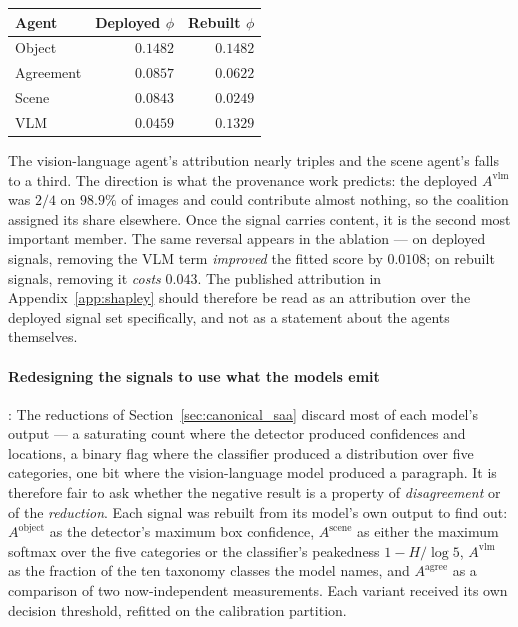 \documentclass[12pt,a4paper]{report}
\begin{document}
\begin{enumerate}
\begin{center}
\small
\begin{tabular}{@{}l r r@{}}
\toprule
\textbf{Agent} & \textbf{Deployed $\phi$} & \textbf{Rebuilt $\phi$} \\
\midrule
Object & $0.1482$ & $0.1482$ \\
Agreement & $0.0857$ & $0.0622$ \\
Scene & $0.0843$ & $\mathbf{0.0249}$ \\
VLM & $0.0459$ & $\mathbf{0.1329}$ \\
\bottomrule
\end{tabular}
\end{center}

The vision-language agent's attribution nearly triples and the scene agent's falls to a third. The
direction is what the provenance work predicts: the deployed $A^{\text{vlm}}$ was $2/4$ on $98.9\%$
of images and could contribute almost nothing, so the coalition assigned its share elsewhere. Once
the signal carries content, it is the second most important member. The same reversal appears in
the ablation --- on deployed signals, removing the VLM term \emph{improved} the fitted score by
$0.0108$; on rebuilt signals, removing it \emph{costs} $0.043$. The published attribution in
Appendix~\ref{app:shapley} should therefore be read as an attribution over the deployed signal set
specifically, and not as a statement about the agents themselves.

\paragraph{Redesigning the signals to use what the models emit}: The reductions of
Section~\ref{sec:canonical_saa} discard most of each model's output --- a saturating count where
the detector produced confidences and locations, a binary flag where the classifier produced a
distribution over five categories, one bit where the vision-language model produced a paragraph.
It is therefore fair to ask whether the negative result is a property of \emph{disagreement} or of
the \emph{reduction}. Each signal was rebuilt from its model's own output to find out:
$A^{\text{object}}$ as the detector's maximum box confidence, $A^{\text{scene}}$ as either the
maximum softmax over the five categories or the classifier's peakedness $1-H/\log 5$,
$A^{\text{vlm}}$ as the fraction of the ten taxonomy classes the model names, and
$A^{\text{agree}}$ as a comparison of two now-independent measurements. Each variant received its
own decision threshold, refitted on the calibration partition.


\end{enumerate}
\end{document}
